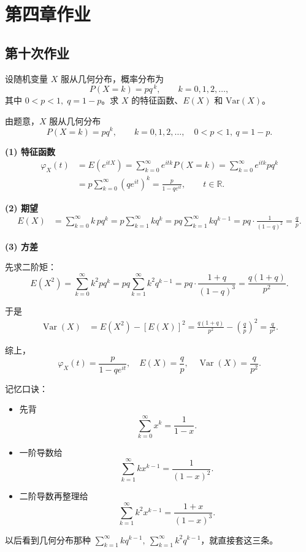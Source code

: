 \chapter{第四章作业}

\section{第十次作业}
\begin{homework}[4.1]
设随机变量 $X$ 服从几何分布，概率分布为
\[
P(X=k)=p q^{\,k},\qquad k=0,1,2,\ldots,
\]
其中 $0<p<1,\; q=1-p$。求 $X$ 的特征函数、$E(X)$ 和 $\mathrm{Var}(X)$。
\end{homework}
\begin{solution}
由题意，$X$ 服从几何分布
\[
P(X=k)=p q^{k},\qquad k=0,1,2,\dots,\quad 0<p<1,\ q=1-p.
\]

\textbf{(1) 特征函数}
\[
\begin{aligned}
\varphi_X(t)
&=E(e^{itX})
=\sum_{k=0}^{\infty} e^{itk} P(X=k)
=\sum_{k=0}^{\infty} e^{itk} p q^{k}  \\
&= p\sum_{k=0}^{\infty}(q e^{it})^{k}
= \frac{p}{1-q e^{it}},\qquad t\in\mathbb R.
\end{aligned}
\]

\textbf{(2) 期望}
\[
\begin{aligned}
E(X)
&=\sum_{k=0}^{\infty} k\,p q^{k}
=p\sum_{k=1}^{\infty} k q^{k}
=pq\sum_{k=1}^{\infty} k q^{k-1}
=pq\cdot\frac{1}{(1-q)^2}
=\frac{q}{p}.
\end{aligned}
\]

\textbf{(3) 方差}

先求二阶矩：
\[
E(X^2)
=\sum_{k=0}^{\infty}k^2 p q^{k}
=pq\sum_{k=1}^{\infty}k^2 q^{k-1}
=pq\cdot\frac{1+q}{(1-q)^3}
=\frac{q(1+q)}{p^2}.
\]

于是
\[
\begin{aligned}
\operatorname{Var}(X)
&=E(X^2)-[E(X)]^2
=\frac{q(1+q)}{p^2}-\left(\frac{q}{p}\right)^2
=\frac{q}{p^2}.
\end{aligned}
\]

综上，
\[
\boxed{\displaystyle
\varphi_X(t)=\frac{p}{1-qe^{it}},\quad
E(X)=\frac{q}{p},\quad
\operatorname{Var}(X)=\frac{q}{p^{2}}.}
\]
\end{solution}
\begin{dxtips}
  记忆口诀：
\begin{itemize}
  \item 先背
  \[
    \sum_{k=0}^{\infty} x^k = \frac{1}{1-x}.
  \]
  \item 一阶导数给
  \[
    \sum_{k=1}^{\infty} k x^{k-1} = \frac{1}{(1-x)^2}.
  \]
  \item 二阶导数再整理给
  \[
    \sum_{k=1}^{\infty} k^2 x^{k-1} = \frac{1+x}{(1-x)^3}.
  \]
\end{itemize}

以后看到几何分布那种
\(\displaystyle \sum_{k=1}^{\infty} k q^{k-1},\ 
\sum_{k=1}^{\infty} k^2 q^{k-1}\)，就直接套这三条。
\end{dxtips}
